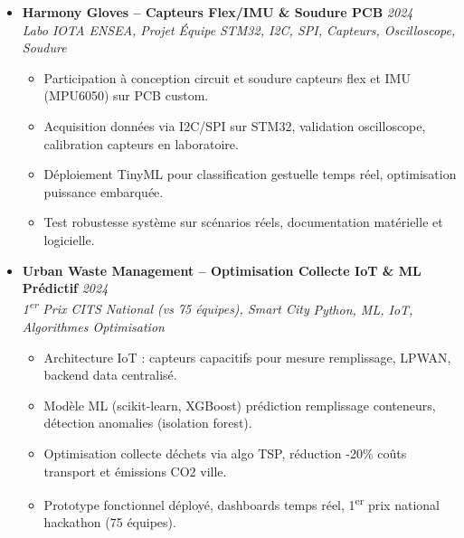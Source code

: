 \documentclass[a4paper,11pt]{article}
\begin{document}
\begin{itemize}[leftmargin=*, label={-}]
\begin{itemize}[leftmargin=0.4cm, nosep, label=\tiny$\bullet$]
        \end{itemize}
    \vspace{3pt}
    \item \textbf{Harmony Gloves -- Capteurs Flex/IMU \& Soudure PCB} \hfill \textit{2024} \\
    \textit{Labo IOTA ENSEA, Projet \'Equipe} \hfill \textit{STM32, I2C, SPI, Capteurs, Oscilloscope, Soudure}
    \vspace{-2pt}
        \begin{itemize}[leftmargin=0.4cm, nosep, label=\tiny$\bullet$]
            \item \small{Participation \`a conception circuit et soudure capteurs flex et IMU (MPU6050) sur PCB custom.}
            \item \small{Acquisition donn\'ees via I2C/SPI sur STM32, validation oscilloscope, calibration capteurs en laboratoire.}
            \item \small{D\'eploiement TinyML pour classification gestuelle temps r\'eel, optimisation puissance embarqu\'ee.}
            \item \small{Test robustesse syst\`eme sur sc\'enarios r\'eels, documentation mat\'erielle et logicielle.}
        \end{itemize}
    \vspace{3pt}
    \item \textbf{Urban Waste Management -- Optimisation Collecte IoT \& ML Pr\'edictif} \hfill \textit{2024} \\
    \textit{1\textsuperscript{er} Prix CITS National (vs 75 \'equipes), Smart City} \hfill \textit{Python, ML, IoT, Algorithmes Optimisation}
    \vspace{-2pt}
        \begin{itemize}[leftmargin=0.4cm, nosep, label=\tiny$\bullet$]
            \item \small{Architecture IoT : capteurs capacitifs pour mesure remplissage, LPWAN, backend data centralis\'e.}
            \item \small{Mod\`ele ML (scikit-learn, XGBoost) pr\'ediction remplissage conteneurs, d\'etection anomalies (isolation forest).}
            \item \small{Optimisation collecte d\'echets via algo TSP, r\'eduction -20\% co\^uts transport et \'emissions CO2 ville.}
            \item \small{Prototype fonctionnel d\'eploy\'e, dashboards temps r\'eel, 1\textsuperscript{er} prix national hackathon (75 \'equipes).}
        \end{itemize}
\end{itemize}
\end{document}
